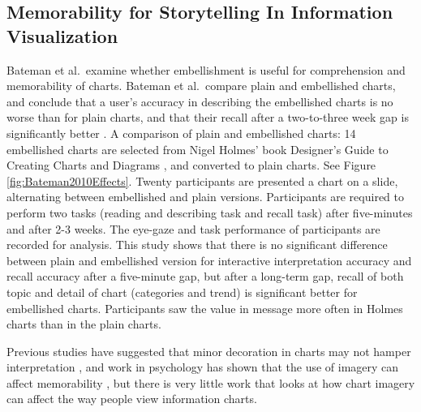 \documentclass{egpubl}
\begin{document}
\subsection{Memorability for Storytelling In Information Visualization}
Bateman et al.\ examine whether embellishment is useful for comprehension and memorability of charts. Bateman et al.\ compare plain and embellished charts, and conclude that a user's accuracy in describing the embellished charts is no worse than for plain charts, and that their recall after a two-to-three week gap is significantly better \cite{bateman}. 
A comparison of plain and embellished charts: 14 embellished charts are selected from Nigel Holmes' book Designer's Guide to Creating 
Charts and Diagrams \cite{holmes}, and converted to plain charts. See Figure \ref{fig:Bateman2010Effects}. Twenty participants are presented a chart on a slide, alternating between embellished and plain versions. Participants are required to perform two tasks (reading and describing task and recall task) after five-minutes and after 2-3 weeks. The eye-gaze and task performance of participants are recorded for analysis. This study shows that there is no significant difference between plain and embellished version for interactive interpretation accuracy and recall accuracy after a five-minute gap,
but after a long-term gap, recall of both topic and detail of chart (categories and trend) is significant better for embellished charts. Participants saw the value in message more often in Holmes charts than in the plain charts.

Previous studies have suggested that minor decoration in charts may not hamper interpretation \cite{Blasio}, and work in psychology has shown that the use of imagery can affect memorability \cite{gambrell}, but there is very little work that looks at how chart imagery can affect the way people view information charts. 
\end{document}
